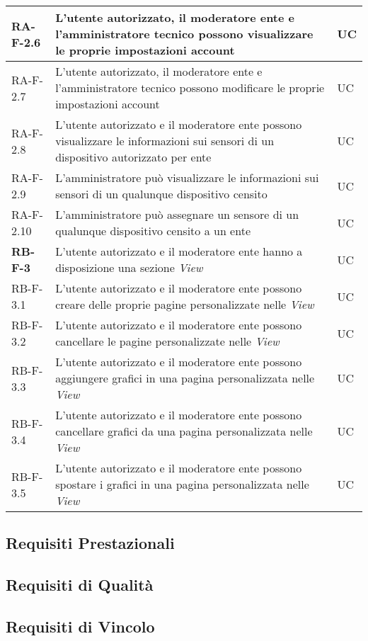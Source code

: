 \begin{center}
\begin{longtable}{|p{3cm}|p{10cm}|p{2cm}|}
		{\color{gray} RA-F-}2.6 & L'utente autorizzato, il moderatore ente e l'amministratore tecnico possono visualizzare le proprie impostazioni account & UC \\ \hline
		{\color{gray} RA-F-}2.7 & L'utente autorizzato, il moderatore ente e l'amministratore tecnico possono modificare le proprie impostazioni account & UC \\ \hline
		
		{\color{gray} RA-F-}2.8 & L'utente autorizzato e il moderatore ente possono visualizzare le informazioni sui sensori di un dispositivo autorizzato per ente & UC \\ \hline
		{\color{gray} RA-F-}2.9 & L'amministratore può visualizzare le informazioni sui sensori di un qualunque dispositivo censito & UC \\ \hline
		{\color{gray} RA-F-}2.10 & L'amministratore può assegnare un sensore di un qualunque dispositivo censito a un ente & UC \\ \hline

		\rowcolor{redroundrobin}
		\textbf{RB-F-3} & L'utente autorizzato e il moderatore ente hanno a disposizione una sezione \textit{View} & UC \\ \hline
		RB-F-3.1 & L'utente autorizzato e il moderatore ente possono creare delle proprie pagine personalizzate nelle \textit{View} & UC \\ \hline
		RB-F-3.2 & L'utente autorizzato e il moderatore ente possono cancellare le pagine personalizzate nelle \textit{View} & UC \\ \hline
		RB-F-3.3 & L'utente autorizzato e il moderatore ente possono aggiungere grafici in una pagina personalizzata nelle \textit{View} & UC \\ \hline
		RB-F-3.4 & L'utente autorizzato e il moderatore ente possono cancellare grafici da una pagina personalizzata nelle \textit{View} & UC \\ \hline
		RB-F-3.5 & L'utente autorizzato e il moderatore ente possono spostare i grafici in una pagina personalizzata nelle \textit{View} & UC \\ \hline
		\end{longtable}
	\end{center}

	\subsection{Requisiti Prestazionali}
	\subsection{Requisiti di Qualità}
	\subsection{Requisiti di Vincolo}